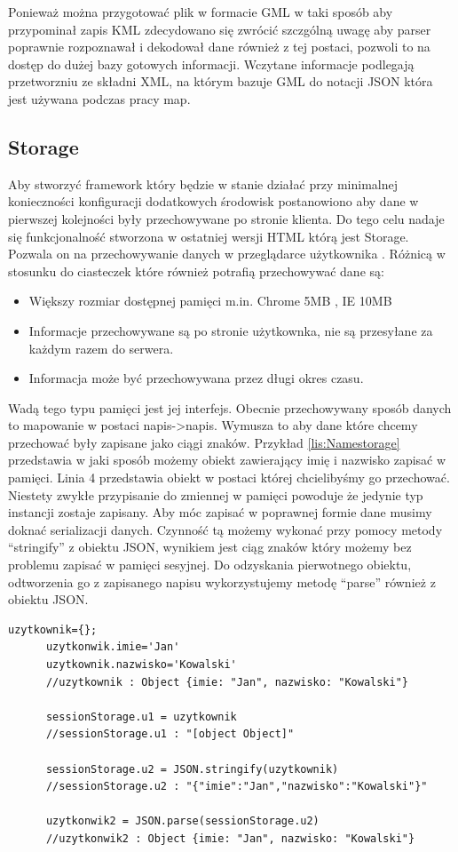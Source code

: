 Ponieważ można przygotować plik w formacie GML w taki sposób aby przypominał zapis KML zdecydowano się zwrócić szczgólną uwagę aby parser poprawnie rozpoznawał i dekodował dane również z tej postaci, pozwoli to na dostęp do dużej bazy gotowych informacji.
Wczytane informacje podlegają przetworzniu ze składni XML, na którym bazuje GML do notacji JSON która jest używana podczas pracy map.

\subsection{Storage}
\label{subsec:storage5}
Aby stworzyć framework który będzie w stanie działać przy minimalnej konieczności konfiguracji dodatkowych środowisk postanowiono aby dane w pierwszej kolejności były przechowywane po stronie klienta. Do tego celu nadaje się funkcjonalność stworzona w ostatniej wersji HTML którą jest Storage. Pozwala on na przechowywanie danych w przeglądarce użytkownika \cite{html5dive}. Różnicą w stosunku do ciasteczek które również potrafią przechowywać dane są:
\begin{itemize}
\item
Większy rozmiar dostępnej pamięci m.in. Chrome 5MB \nocite{chrome5mb}, IE 10MB
\item
Informacje przechowywane są po stronie użytkownka, nie są przesyłane za każdym razem do serwera.
\item
Informacja może być przechowywana przez długi okres czasu.
\end{itemize}

Wadą tego typu pamięci jest jej interfejs. Obecnie przechowywany sposób danych to mapowanie w postaci napis->napis. Wymusza to aby dane które chcemy przechować były zapisane jako ciągi znaków. Przykład \ref{lis:Namestorage} przedstawia w jaki sposób możemy obiekt zawierający imię i nazwisko zapisać w pamięci. Linia 4 przedstawia obiekt w postaci której chcielibyśmy go przechować. Niestety zwykłe przypisanie do zmiennej w pamięci powoduje że jedynie typ instancji zostaje zapisany. Aby móc zapisać w poprawnej formie dane musimy doknać serializacji danych. Czynność tą możemy wykonać przy pomocy metody ``stringify'' z obiektu JSON, wynikiem jest ciąg znaków który możemy bez problemu zapisać w pamięci sesyjnej. Do odzyskania pierwotnego obiektu, odtworzenia go z zapisanego napisu wykorzystujemy metodę ``parse'' również z obiektu JSON.

\lstset{language=JavaScript}
\label{lis:Namestorage}
\begin{lstlisting}[caption=Wykorzystanie Storage]
      uzytkownik={};
      uzytkonwik.imie='Jan'
      uzytkownik.nazwisko='Kowalski'
      //uzytkownik : Object {imie: "Jan", nazwisko: "Kowalski"}

      sessionStorage.u1 = uzytkownik
      //sessionStorage.u1 : "[object Object]"

      sessionStorage.u2 = JSON.stringify(uzytkownik)
      //sessionStorage.u2 : "{"imie":"Jan","nazwisko":"Kowalski"}"

      uzytkonwik2 = JSON.parse(sessionStorage.u2)
      //uzytkonwik2 : Object {imie: "Jan", nazwisko: "Kowalski"}
\end{lstlisting}

